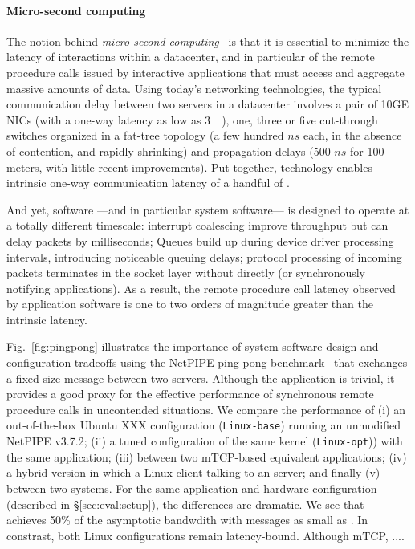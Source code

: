 \paragraph{Micro-second computing}

The notion behind \emph{micro-second computing}~\cite{luiz-isscc} is
that it is essential to minimize the latency of interactions within a
datacenter, and in particular of the remote procedure calls issued by
interactive applications that must access and aggregate massive
amounts of data.  Using today's networking technologies, the typical
communication delay between two servers in a datacenter involves a
pair of 10GE NICs (with a one-way latency as low as
3~\microsecond~\cite{cisco-sereno}), one, three or five cut-through
switches organized in a fat-tree topology (a few hundred $ns$ each, in
the absence of contention, and rapidly shrinking) and propagation
delays (500 $ns$ for 100 meters, with little recent improvements).
Put together, technology enables intrinsic one-way communication
latency of a handful of \microsecond.  

And yet, software ---and in particular system software--- is designed
to operate at a totally different timescale: interrupt coalescing
improve throughput but can delay packets by milliseconds; Queues build
up during device driver processing intervals, introducing noticeable
queuing delays; protocol processing of incoming packets terminates in
the socket layer without directly (or synchronously notifying
applications).  As a result, the remote procedure call latency
observed by application software is one to two orders of magnitude
greater than the intrinsic latency.




Fig.~\ref{fig:pingpong} illustrates the importance of system software
design and configuration tradeoffs using the NetPIPE ping-pong
benchmark~\cite{snell1996netpipe} that exchanges a fixed-size message
between two servers.  Although the application is trivial, it provides
a good proxy for the effective performance of synchronous remote
procedure calls in uncontended situations.  We compare the performance
of (i) an out-of-the-box Ubuntu XXX configuration
(\texttt{Linux-base}) running an unmodified NetPIPE v3.7.2; (ii) a
tuned configuration of the same kernel (\texttt{Linux-opt})) with the
same application; (iii) between two mTCP-based equivalent
applications; (iv) a hybrid version in which a Linux client talking to
an \ix server; and finally (v) between two \ix systems.  For the same
application and hardware configuration (described in
\S\ref{sec:eval:setup}), the differences are dramatic.  We see that
\ix-\ix achieves 50\% of the asymptotic bandwdith with messages as small
as .  In constrast, both Linux configurations remain
latency-bound.  Although mTCP, ....


